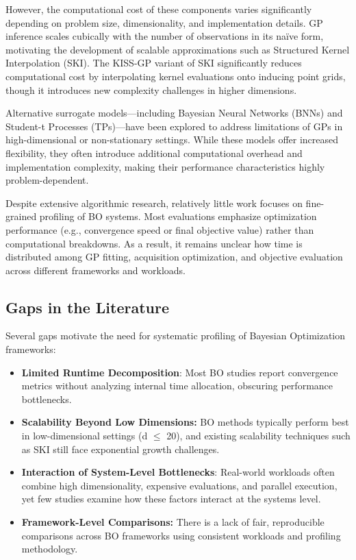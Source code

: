 \documentclass[11pt]{article}
\begin{document}
However, the computational cost of these components varies significantly depending on problem size, dimensionality, and implementation details. GP inference scales cubically with the number of observations in its naïve form, motivating the development of scalable approximations such as Structured Kernel Interpolation (SKI). The KISS-GP variant of SKI significantly reduces computational cost by interpolating kernel evaluations onto inducing point grids, though it introduces new complexity challenges in higher dimensions.

Alternative surrogate models—including Bayesian Neural Networks (BNNs) and Student-t Processes (TPs)—have been explored to address limitations of GPs in high-dimensional or non-stationary settings. While these models offer increased flexibility, they often introduce additional computational overhead and implementation complexity, making their performance characteristics highly problem-dependent.

Despite extensive algorithmic research, relatively little work focuses on fine-grained profiling of BO systems. Most evaluations emphasize optimization performance (e.g., convergence speed or final objective value) rather than computational breakdowns. As a result, it remains unclear how time is distributed among GP fitting, acquisition optimization, and objective evaluation across different frameworks and workloads.
\subsection{Gaps in the Literature}
Several gaps motivate the need for systematic profiling of Bayesian Optimization frameworks:
\begin{itemize}
    \item \textbf{Limited Runtime Decomposition}: Most BO studies report convergence metrics without analyzing internal time allocation, obscuring performance bottlenecks.
    \item \textbf{Scalability Beyond Low Dimensions:} BO methods typically perform best in low-dimensional settings (d $\leq$ 20), and existing scalability techniques such as SKI still face exponential growth challenges.
    \item \textbf{Interaction of System-Level Bottlenecks}: Real-world workloads often combine high dimensionality, expensive evaluations, and parallel execution, yet few studies examine how these factors interact at the systems level.
    \item \textbf{Framework-Level Comparisons:} There is a lack of fair, reproducible comparisons across BO frameworks using consistent workloads and profiling methodology.
\end{itemize}
\end{document}
